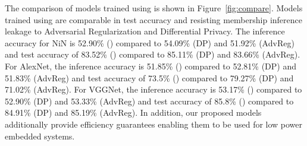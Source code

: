 




The comparison of models trained using \method\hspace{0.02in} is shown in Figure~\ref{fig:compare}.
Models trained using \method\hspace{0.02in} are comparable in test accuracy and resisting membership inference leakage to Adversarial Regularization and Differential Privacy.
The inference accuracy for NiN is 52.90\% (\method) compared to 54.09\% (DP) and 51.92\% (AdvReg) and test accuracy of 83.52\% (\method) compared to 85.11\% (DP) and 83.66\% (AdvReg).
For AlexNet, the inference accuracy is 51.85\% (\method) compared to 52.81\% (DP) and 51.83\% (AdvReg) and test accuracy of 73.5\% (\method) compared to 79.27\% (DP) and 71.02\% (AdvReg).
For VGGNet, the inference accuracy is 53.17\% (\method) compared to 52.90\% (DP) and 53.33\% (AdvReg) and test accuracy of 85.8\% (\method) compared to 84.91\% (DP) and 85.19\% (AdvReg).
In addition, our proposed models additionally provide efficiency guarantees enabling them to be used for low power embedded systems.

